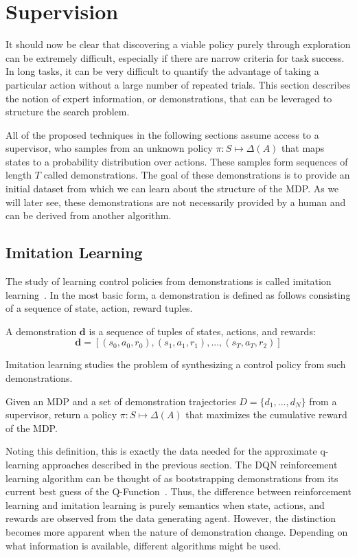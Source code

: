 \section{Supervision}
It should now be clear that discovering a viable policy purely through exploration can be extremely difficult, especially if there are narrow criteria for task success.
In long tasks, it can be very difficult to quantify the advantage of taking a particular action without a large number of repeated trials. This section describes the notion of expert information, or demonstrations, that can be leveraged to structure the search problem.

All of the proposed techniques in the following sections assume access to a supervisor, who samples from an unknown policy $\pi: S \mapsto \Delta(A)$ that maps states to a probability distribution over actions. These samples form sequences of length $T$ called demonstrations. 
The goal of these demonstrations is to provide an initial dataset from which we can learn about the structure of the MDP. As we will later see, these demonstrations are not necessarily provided by a human and can be derived from another algorithm.

\subsection*{Imitation Learning}
The study of learning control policies from demonstrations is called imitation learning~\cite{osa2018algorithmic}. In the most basic form, a demonstration is defined as follows consisting of a sequence of state, action, reward tuples. 

\begin{definition}[Demonstration]
A demonstration $\mathbf{d}$ is a sequence of tuples of states, actions, and rewards:
\[\mathbf{d} = [(s_0,a_0,r_0),(s_1,a_1,r_1),...,(s_T,a_T,r_2)]\]
\end{definition}

Imitation learning studies the problem of synthesizing a control policy from such demonstrations.

\begin{problem}
Given an MDP and a set of demonstration trajectories $D = \{d_1,...,d_N\}$ from a supervisor, return a policy $\pi: S \mapsto \Delta(A)$ that maximizes the cumulative reward of the MDP.
\end{problem}

Noting this definition, this is exactly the data needed for the approximate q-learning approaches described in the previous section.
The DQN reinforcement learning algorithm can be thought of as bootstrapping demonstrations from its current best guess of the Q-Function~\cite{mnih2015human}. Thus, the difference between reinforcement learning and imitation learning is purely semantics when state, actions, and rewards are observed from the data generating agent. However, the distinction becomes more apparent when the nature of demonstration change. Depending on what information is available, different algorithms might be used. 

